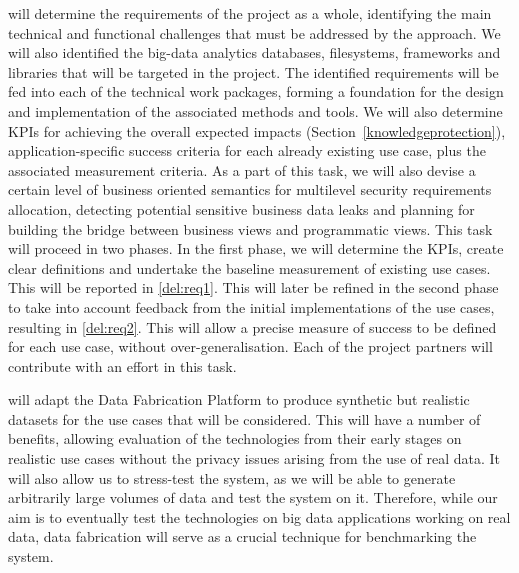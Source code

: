 \begin{Workpackage}{\thewpno}
\begin{Task}
\TaskResults{%
\ref{del:req1},
\ref{del:req2}
}
\TaskHeader{}
\theTask{} will determine the requirements of the \TheProject{} project as a whole, identifying the main technical and functional challenges that must be addressed by the \TheProject{} approach. We will also identified the big-data analytics databases, filesystems, frameworks and libraries that will be targeted in the project. The identified  requirements will be fed into each of the technical work packages, forming a foundation for the design and implementation of the associated methods and tools. We will also determine KPIs for achieving the overall expected impacts (Section~\ref{knowledgeprotection}), application-specific success criteria for each already existing use case, plus the associated measurement criteria. As a part of this task, we will also devise a certain level of business oriented semantics for multilevel security requirements allocation, detecting potential sensitive business data leaks and planning for building the bridge between business views and programmatic views. This task will proceed in two phases. In the first phase, we will determine the KPIs, create clear definitions and undertake the baseline measurement of existing use cases. This will be reported in \ref{del:req1}. This will later be refined in the second phase to take into account feedback from the initial implementations of the use cases, resulting in \ref{del:req2}. This will allow a precise measure of success to be defined for each use case, without over-generalisation. Each of the project partners will contribute with an effort in this task.
\end{Task}

\begin{Task}
\TaskResults{%
\ref{del:eval1},
\ref{del:eval2},
\ref{del:eval3}
}
\TaskHeader{}
\theTask{} will adapt the \IBMshort{} Data Fabrication Platform to produce synthetic but realistic datasets for the use cases that will be considered. This will have a number of benefits, allowing evaluation of the \TheProject{} technologies from their early stages on realistic use cases without the privacy issues arising from the use of real data. It will also allow us to stress-test the system, as we will be able to generate arbitrarily large volumes of data and test the system on it. Therefore, while our aim is to eventually test the \TheProject{} technologies on big data applications working on real data, data fabrication will serve as a crucial technique for benchmarking the system.
\end{Task}


\end{Workpackage}
